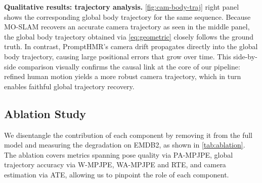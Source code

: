 \noindent\textbf{Qualitative results: trajectory analysis.}
\cref{fig:cam-body-traj} right panel shows the corresponding global body trajectory for the same sequence. Because MO-SLAM recovers an accurate camera trajectory as seen in the middle panel, the global body trajectory obtained via \cref{eq:geometric} closely follows the ground truth. In contrast, PromptHMR's camera drift propagates directly into the global body trajectory, causing large positional errors that grow over time. This side-by-side comparison visually confirms the causal link at the core of our pipeline: refined human motion yields a more robust camera trajectory, which in turn enables faithful global trajectory recovery.



\subsection{Ablation Study}
\label{sec:ablation}

We disentangle the contribution of each component by removing it from the full model and measuring the degradation on EMDB2, as shown in \cref{tab:ablation}. The ablation covers metrics spanning pose quality via PA-MPJPE, global trajectory accuracy via W-MPJPE, WA-MPJPE and RTE, and camera estimation via ATE, allowing us to pinpoint the role of each component.

\begin{table}[t]
  \caption{\textbf{Ablation study on EMDB2.} Each row removes one component from the full model. PA-MPJPE, WA-MPJPE, W-MPJPE in mm; RTE in \%; ATE in m. All $\downarrow$.}
  \label{tab:ablation}
  \centering
  \setlength{\tabcolsep}{4pt}
\end{table}


